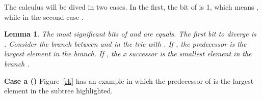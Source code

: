 \documentclass[11pt]{article}
\newtheorem{lema}{Lemma}
\begin{document}
The  calculus will be dived in two cases. In the first, the bit   of  is 1, which means , while in the second case .





\begin{lema} 
The most significant bits of  and  are equals. The first bit to diverge is . Consider the branch between  and  in the trie with . If  , the  predecessor is the largest element in the  branch. If , the x successor is the smallest element in the branch .
\end{lema}



\textbf{Case a ()} Figure~\ref{rk} has an example in which the predecessor of  is the largest element in the subtree highlighted.
\end{document}
